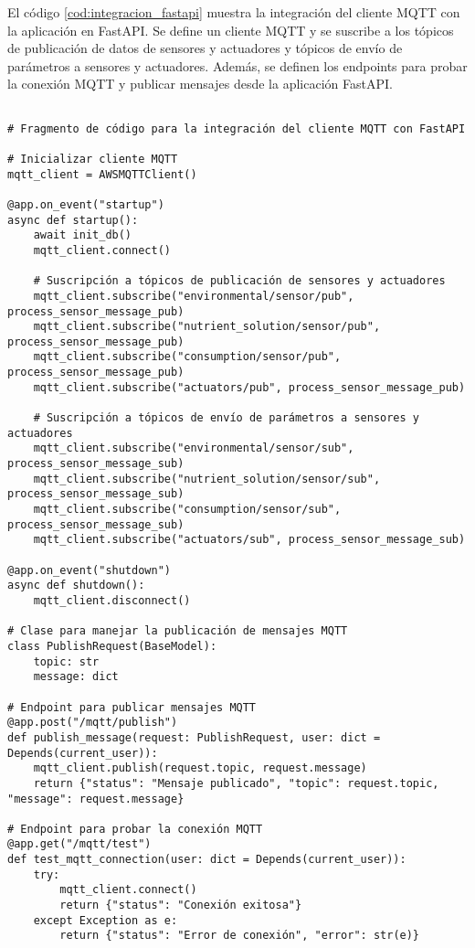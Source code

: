 El código \ref{cod:integracion_fastapi} muestra la integración del cliente MQTT
con la aplicación en FastAPI. Se define un cliente MQTT y se suscribe a los
tópicos de publicación de datos de sensores y actuadores y tópicos de envío de
parámetros a sensores y actuadores. Además, se definen los endpoints para
probar la conexión MQTT y publicar mensajes desde la aplicación FastAPI.

\begin{lstlisting}[label=cod:integracion_fastapi,caption=Cliente MQTT en FastAPI, language=PythonUTF8]

# Fragmento de código para la integración del cliente MQTT con FastAPI

# Inicializar cliente MQTT
mqtt_client = AWSMQTTClient()

@app.on_event("startup")
async def startup():
    await init_db()
    mqtt_client.connect()
         
    # Suscripción a tópicos de publicación de sensores y actuadores
    mqtt_client.subscribe("environmental/sensor/pub", process_sensor_message_pub)
    mqtt_client.subscribe("nutrient_solution/sensor/pub", process_sensor_message_pub)
    mqtt_client.subscribe("consumption/sensor/pub", process_sensor_message_pub)
    mqtt_client.subscribe("actuators/pub", process_sensor_message_pub)

    # Suscripción a tópicos de envío de parámetros a sensores y actuadores
    mqtt_client.subscribe("environmental/sensor/sub", process_sensor_message_sub)
    mqtt_client.subscribe("nutrient_solution/sensor/sub", process_sensor_message_sub)
    mqtt_client.subscribe("consumption/sensor/sub", process_sensor_message_sub)
    mqtt_client.subscribe("actuators/sub", process_sensor_message_sub)

@app.on_event("shutdown")
async def shutdown():
    mqtt_client.disconnect()

# Clase para manejar la publicación de mensajes MQTT
class PublishRequest(BaseModel):
    topic: str
    message: dict
    
# Endpoint para publicar mensajes MQTT
@app.post("/mqtt/publish")
def publish_message(request: PublishRequest, user: dict = Depends(current_user)):
    mqtt_client.publish(request.topic, request.message)
    return {"status": "Mensaje publicado", "topic": request.topic, "message": request.message}
    
# Endpoint para probar la conexión MQTT
@app.get("/mqtt/test")
def test_mqtt_connection(user: dict = Depends(current_user)):
    try:
        mqtt_client.connect()
        return {"status": "Conexión exitosa"}
    except Exception as e:
        return {"status": "Error de conexión", "error": str(e)}
\end{lstlisting}

